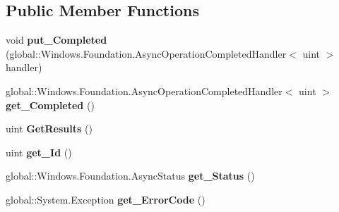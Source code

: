 \subsection*{Public Member Functions}
\begin{DoxyCompactItemize}
\item 
\mbox{\label{class_windows_1_1_storage_1_1_streams_1_1_data_reader_load_operation_a825056cde4984124d6ba72b348a21927}} 
void {\bfseries put\+\_\+\+Completed} (global\+::\+Windows.\+Foundation.\+Async\+Operation\+Completed\+Handler$<$ uint $>$ handler)
\item 
\mbox{\label{class_windows_1_1_storage_1_1_streams_1_1_data_reader_load_operation_ac568f7677660d25791d132dadf2fa2b8}} 
global\+::\+Windows.\+Foundation.\+Async\+Operation\+Completed\+Handler$<$ uint $>$ {\bfseries get\+\_\+\+Completed} ()
\item 
\mbox{\label{class_windows_1_1_storage_1_1_streams_1_1_data_reader_load_operation_a71f1295140022865ce49695a3490008d}} 
uint {\bfseries Get\+Results} ()
\item 
\mbox{\label{class_windows_1_1_storage_1_1_streams_1_1_data_reader_load_operation_a6ef99092e68b2e93880c4edcaf0fd191}} 
uint {\bfseries get\+\_\+\+Id} ()
\item 
\mbox{\label{class_windows_1_1_storage_1_1_streams_1_1_data_reader_load_operation_a7eee8fde2644e8d129c57b70e838cd7d}} 
global\+::\+Windows.\+Foundation.\+Async\+Status {\bfseries get\+\_\+\+Status} ()
\item 
\mbox{\label{class_windows_1_1_storage_1_1_streams_1_1_data_reader_load_operation_a2c6181e3b5357ed9b288bdf9ac27171d}} 
global\+::\+System.\+Exception {\bfseries get\+\_\+\+Error\+Code} ()
\item 
\mbox{\label{class_windows_1_1_storage_1_1_streams_1_1_data_reader_load_operation_afc9128d61314f4f914e6ced27b10551a}} 

\end{DoxyCompactItemize}
